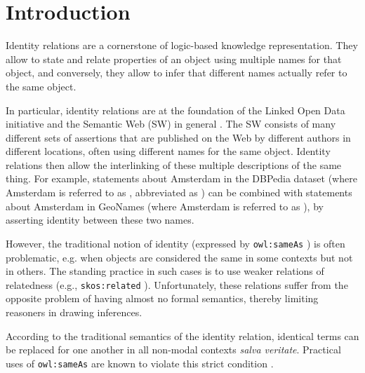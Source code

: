 \section{Introduction}
\label{sec:introduction}

Identity relations are a cornerstone of logic-based knowledge representation.
They allow to state and relate properties of an object
  using multiple names for that object, and conversely,
  they allow to infer that different names actually refer to the same object.

In particular, identity relations are
  at the foundation of the Linked Open Data initiative
  and the Semantic Web (SW) in general \cite{BizerCyganiakHeath2007}.
The SW consists of many different sets of assertions
  that are published on the Web by different authors in different locations,
  often using different names for the same object.
Identity relations then allow the interlinking of these multiple descriptions
  of the same thing.
For example, statements about Amsterdam in the DBPedia dataset
  (where Amsterdam is referred to as
  , abbreviated as
  )
  can be combined with statements about Amsterdam in GeoNames
  (where Amsterdam is referred to as
  ), by asserting identity between
  these two names.

However, the traditional notion of identity
  (expressed by \texttt{owl:sameAs} \cite{MotikPaterschneiderGrau2012})
  is often problematic, e.g. when objects are considered the same in some
  contexts but not in others.
The standing practice in such cases is to use weaker relations of relatedness
  (e.g., \texttt{skos:related} \cite{MilesBechhofer2009}).
Unfortunately, these relations suffer from the opposite problem of having
  almost no formal semantics, thereby limiting reasoners
  in drawing inferences.

According to the traditional semantics of the identity relation,
  identical terms can be replaced for one another in all non-modal contexts
  \emph{salva veritate}.
Practical uses of \texttt{owl:sameAs} are known to violate this
  strict condition
  \cite{HalpinHayes2010,HalpinHayesMccuskerMcguinnessThompson2010}.

\begin{comment}
The SW is not only a formal model,
  but is also a social component that evolves over time,
  i.e. it is a social machine cite{Www2013}.
Being a social and symbolic system at the same time,
  meaning on the SW is denoted by its semantics as well as its pragmatics.
\end{comment}

